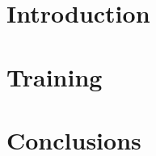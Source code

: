\documentclass[11pt]{report}
\begin{document}

\makecover%


\clearpage
{}
\settableofcontents%
\tableofcontents


\clearpage
\setlistoffigures%
\listoffigures


\clearpage
\setlistoftables%
\listoftables





\chapter{Introduction}
\label{chap:introduction}



\chapter{Training}
\label{chap:training}





\chapter{Conclusions}
\label{chap:conclusions}



\clearpage




\appendix






\makedisclaimer%
\end{document}
